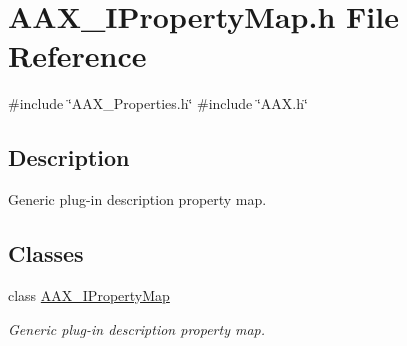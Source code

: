 \hypertarget{a00632}{}\section{A\+A\+X\+\_\+\+I\+Property\+Map.\+h File Reference}
\label{a00632}
{\ttfamily \#include \char`\"{}A\+A\+X\+\_\+\+Properties.\+h\char`\"{}}\newline
{\ttfamily \#include \char`\"{}A\+A\+X.\+h\char`\"{}}\newline


\subsection{Description}
Generic plug-\/in description property map. 

\subsection*{Classes}
\begin{DoxyCompactItemize}
\item 
class \mbox{\hyperlink{a01869}{A\+A\+X\+\_\+\+I\+Property\+Map}}
\begin{DoxyCompactList}\small\item\em Generic plug-\/in description property map. \end{DoxyCompactList}\end{DoxyCompactItemize}
